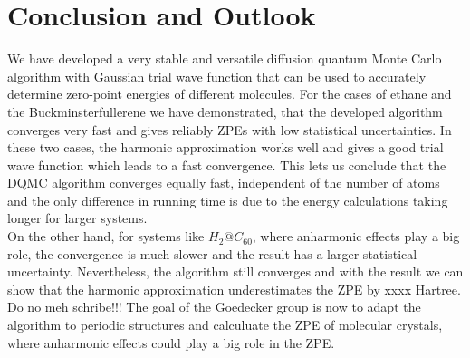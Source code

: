 \documentclass [12pt]{report}
\begin{document}
\chapter{Conclusion and Outlook}
We have developed a very stable and versatile diffusion quantum Monte Carlo algorithm with Gaussian trial wave function that can be used to accurately determine zero-point energies of different molecules. For the cases of ethane and the Buckminsterfullerene we have demonstrated, that the developed algorithm converges very fast and gives reliably ZPEs with low statistical uncertainties. In these two cases, the harmonic approximation works well and gives a good trial wave function which leads to a fast convergence. This lets us conclude that the DQMC algorithm converges equally fast, independent of the number of atoms and the only difference in running time is due to the energy calculations taking longer for larger systems. \\
On the other hand, for systems like $H_2@C_{60}$, where anharmonic effects play a big role, the convergence is much slower and the result has a larger statistical uncertainty. Nevertheless, the algorithm still converges and with the result we can show that the harmonic approximation underestimates the ZPE by xxxx Hartree. \\
Do no meh schribe!!!
The goal of the Goedecker group is now to adapt the algorithm to periodic structures and calculuate the ZPE of molecular crystals, where anharmonic effects could play a big role in the ZPE.
\end{document}
